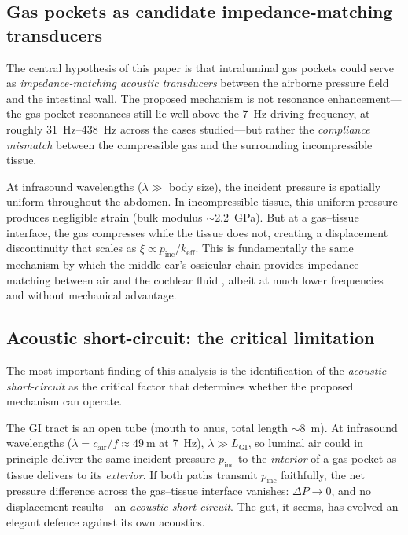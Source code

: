 \documentclass[12pt]{article}
\begin{document}
\subsection{Gas pockets as candidate impedance-matching transducers}

The central hypothesis of this paper is that intraluminal gas pockets could
serve as \emph{impedance-matching acoustic transducers} between the airborne
pressure field and the intestinal wall.  The proposed mechanism is not resonance
enhancement---the gas-pocket resonances still lie well above the
\SI{7}{\hertz} driving frequency, at roughly \SIrange{31}{438}{\hertz}
across the cases studied---but rather the \emph{compliance mismatch} between the
compressible gas and the surrounding incompressible tissue.

At infrasound wavelengths ($\lambda \gg$ body size), the incident pressure
is spatially uniform throughout the abdomen.  In incompressible tissue,
this uniform pressure produces negligible strain (bulk modulus
$\sim$\SI{2.2}{\giga\pascal}).  But at a gas--tissue interface, the gas
compresses while the tissue does not, creating a displacement discontinuity
that scales as $\xi \propto p_\text{inc}/k_\text{eff}$.  This is
fundamentally the same mechanism by which the middle ear's ossicular chain
provides impedance matching between air and the cochlear fluid
\citep{Junger1986}, albeit at much lower frequencies and without mechanical
advantage.


\subsection{Acoustic short-circuit: the critical limitation}
\label{sec:short_circuit}

The most important finding of this analysis is the identification of the
\emph{acoustic short-circuit} as the critical factor that determines
whether the proposed mechanism can operate.

The GI tract is an open tube (mouth to anus, total length
$\sim$\SI{8}{\metre}).  At infrasound wavelengths
($\lambda = c_\text{air}/f \approx \SI{49}{\metre}$ at \SI{7}{\hertz}),
$\lambda \gg L_\text{GI}$, so luminal air could in principle deliver the
same incident pressure $p_\text{inc}$ to the \emph{interior} of a gas
pocket as tissue delivers to its \emph{exterior}.  If both paths transmit
$p_\text{inc}$ faithfully, the net pressure difference across the
gas--tissue interface vanishes: $\Delta P \to 0$, and no displacement
results---an \emph{acoustic short circuit}.
The gut, it seems, has evolved an elegant defence against its own acoustics.
\end{document}

